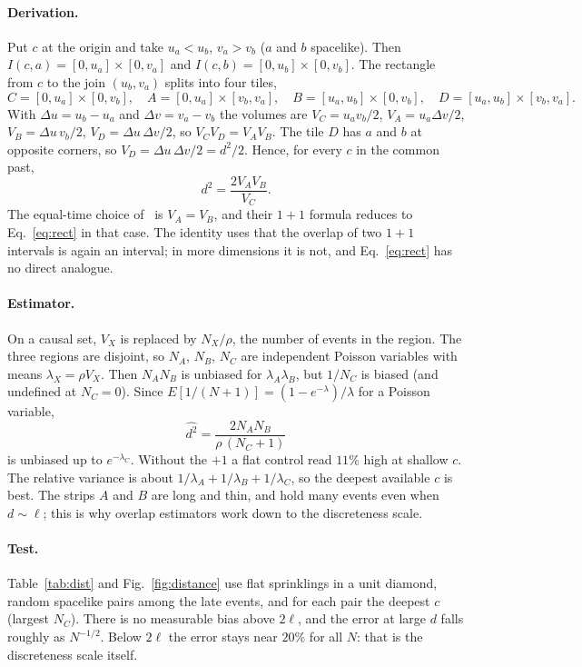 \documentclass[11pt,a4paper]{article}
\begin{document}
\paragraph{Derivation.} Put $c$ at the origin and take $u_a<u_b$, $v_a>v_b$ ($a$ and $b$ spacelike). Then $I(c,a)=[0,u_a]\times[0,v_a]$ and $I(c,b)=[0,u_b]\times[0,v_b]$. The rectangle from $c$ to the join $(u_b,v_a)$ splits into four tiles,
\begin{equation}
C=[0,u_a]\times[0,v_b],\quad A=[0,u_a]\times[v_b,v_a],\quad B=[u_a,u_b]\times[0,v_b],\quad D=[u_a,u_b]\times[v_b,v_a].
\end{equation}
With $\Delta u=u_b-u_a$ and $\Delta v=v_a-v_b$ the volumes are $V_C=u_av_b/2$, $V_A=u_a\Delta v/2$, $V_B=\Delta u\,v_b/2$, $V_D=\Delta u\,\Delta v/2$, so $V_CV_D=V_AV_B$. The tile $D$ has $a$ and $b$ at opposite corners, so $V_D=\Delta u\,\Delta v/2=d^2/2$. Hence, for every $c$ in the common past,
\begin{equation}
d^2=\frac{2V_AV_B}{V_C}.
\label{eq:rect}
\end{equation}
The equal-time choice of~\cite{BK24} is $V_A=V_B$, and their $1+1$ formula reduces to Eq.~\eqref{eq:rect} in that case. The identity uses that the overlap of two $1+1$ intervals is again an interval; in more dimensions it is not, and Eq.~\eqref{eq:rect} has no direct analogue.

\paragraph{Estimator.} On a causal set, $V_X$ is replaced by $N_X/\rho$, the number of events in the region. The three regions are disjoint, so $N_A$, $N_B$, $N_C$ are independent Poisson variables with means $\lambda_X=\rho V_X$. Then $N_AN_B$ is unbiased for $\lambda_A\lambda_B$, but $1/N_C$ is biased (and undefined at $N_C=0$). Since $E[1/(N+1)]=(1-e^{-\lambda})/\lambda$ for a Poisson variable,
\begin{equation}
\widehat{d^2}=\frac{2N_AN_B}{\rho\,(N_C+1)}
\label{eq:est}
\end{equation}
is unbiased up to $e^{-\lambda_C}$. Without the $+1$ a flat control read $11\%$ high at shallow $c$. The relative variance is about $1/\lambda_A+1/\lambda_B+1/\lambda_C$, so the deepest available $c$ is best. The strips $A$ and $B$ are long and thin, and hold many events even when $d\sim\ell$; this is why overlap estimators work down to the discreteness scale.

\paragraph{Test.} Table~\ref{tab:dist} and Fig.~\ref{fig:distance} use flat sprinklings in a unit diamond, random spacelike pairs among the late events, and for each pair the deepest $c$ (largest $N_C$). There is no measurable bias above $2\ell$, and the error at large $d$ falls roughly as $N^{-1/2}$. Below $2\ell$ the error stays near $20\%$ for all $N$: that is the discreteness scale itself.
\end{document}
